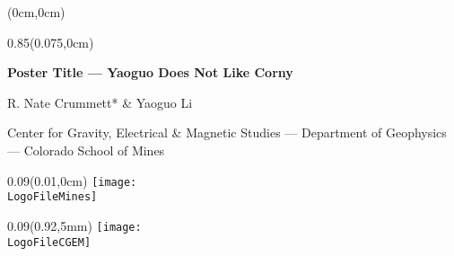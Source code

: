 \documentclass[dark]{cgem-poster}
\newcommand{\PosterTitle}{Poster Title --- Yaoguo Does Not Like Corny}
\newcommand{\PosterFirstAuthor}{R. Nate Crummett}
\newcommand{\PosterSecondAuthor}{Yaoguo Li}
\newcommand{\PosterAffiliationCGEM}{Center for Gravity, Electrical \& Magnetic Studies}
\newcommand{\PosterAffiliationMines}{Colorado School of Mines}
\newcommand{\PosterAffiliationGeophysics}{Department of Geophysics}
\begin{document}

  \newcommand{\titleheight}{0.09\pageheight}
  \newcommand{\PosterCGEMLogoHeight}{\dimexpr(\titleheight - 12mm)\relax}
  
  \begin{textblock*}{\pagewidth}(0cm,0cm)
    \begin{minipage}[t][\titleheight{}][t]{\pagewidth}
    \end{minipage}
  \end{textblock*}
  
  \begin{textblock*}{0.85\pagewidth}(0.075\pagewidth,0cm)
    \begin{center}
      \vspace{5mm}
      \Large
      \textbf{
        \PosterTitle{}
      }
      \par
      \vspace{5mm}
      \normalsize
      { \color{ZeroColor!70}
        \PosterFirstAuthor{}* \& \PosterSecondAuthor{}
        \par
        \small
        \PosterAffiliationCGEM{} --- %
          \PosterAffiliationGeophysics{} --- %
          \PosterAffiliationMines{}
      }
    \end{center}
  \end{textblock*}
  
  \begin{textblock*}{\titleheight{}}(0.01\pagewidth,0cm)
    \centering
    \texttt{[image: \\LogoFileMines]}
  \end{textblock*}
  
  \begin{textblock*}{\titleheight{}}(0.92\pagewidth,5mm)
    \centering
    \texttt{[image: \\LogoFileCGEM]}
  \end{textblock*}
  

  \newlength{\PosterOuterMarginSize}
  \setlength{\PosterOuterMarginSize}{1cm}
\end{document}
